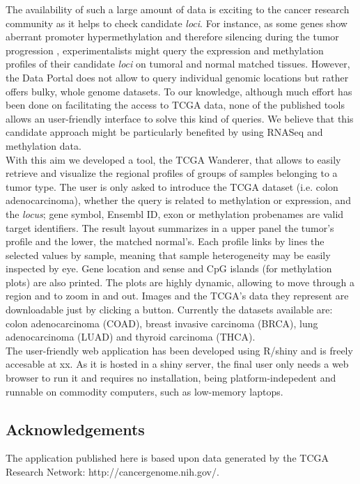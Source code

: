 \documentclass{article}
\begin{document}
The availability of such a large amount of data is exciting to the cancer research community as it helps to check candidate \textit{loci}. For instance, as some genes show aberrant promoter hypermethylation and therefore silencing during the tumor progression \cite{jones2002fundamental}, experimentalists might query the expression and methylation profiles of their candidate \textit{loci} on tumoral and normal matched tissues. However, the Data Portal does not allow to query individual genomic locations but rather offers bulky, whole genome datasets. To our knowledge, although much effort has been done on facilitating the access to TCGA data, none of the published tools allows an user-friendly interface to solve this kind of queries. We believe that this candidate approach might be particularly benefited by using RNASeq and methylation data.\\


With this aim we developed a tool, the TCGA Wanderer, that allows to easily retrieve and visualize the regional profiles of groups of samples belonging to a tumor type. The user is only asked to introduce the TCGA dataset (i.e. colon adenocarcinoma), whether the query is related to methylation or expression, and the \textit{locus}; gene symbol, Ensembl ID, exon or methylation probenames are valid target identifiers. The result layout summarizes in a upper panel the tumor's profile and the lower, the matched normal's. Each profile links by lines the selected values by sample, meaning that sample heterogeneity may be easily inspected by eye. Gene location and sense and CpG islands (for methylation plots) are also printed. The plots are highly dynamic, allowing to move through a region and to zoom in and out. Images and the TCGA's data they represent are downloadable just by clicking a button. Currently the datasets available are: colon adenocarcinoma (COAD), breast invasive carcinoma (BRCA), lung adenocarcinoma (LUAD) and thyroid carcinoma (THCA).  \\


The user-friendly web application has been developed using R/shiny and is freely accesable at xx. As it is hosted in a shiny server, the final user only needs a web browser to run it and requires no installation, being platform-indepedent and runnable on commodity computers, such as low-memory laptops.\\

\subsection{Acknowledgements}
The application published here is based upon data generated by the TCGA Research Network: http://cancergenome.nih.gov/.
\end{document}
